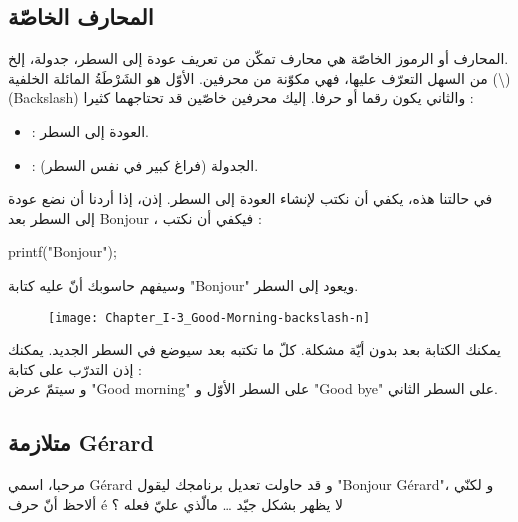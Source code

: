 \subsection{المحارف الخاصّة}

المحارف أو الرموز الخاصّة هي محارف تمكّن من تعريف عودة إلى السطر، جدولة، إلخ.\\
من السهل التعرّف عليها، فهي مكوّنة من محرفين. الأوّل هو الشَرْطَةُ المائلة الخلفية 
(\textbackslash) (\textenglish{Backslash})
والثاني يكون رقما أو حرفا. إليك محرفين خاصّين قد تحتاجهما كثيرا :

\begin{itemize}
  \item {} :
 العودة إلى السطر.
 \item {} :
 الجدولة (فراغ كبير في نفس السطر).
\end{itemize}

في حالتنا هذه، يكفي أن نكتب
 لإنشاء العودة إلى السطر. إذن، إذا أردنا أن نضع عودة إلى السطر بعد
\textenglish{Bonjour}
، فيكفي أن نكتب :

\begin{Csource}
printf("Bonjour\n");
\end{Csource}

وسيفهم حاسوبك أنّ عليه كتابة
"\textenglish{Bonjour}"
 ويعود إلى السطر.

\begin{figure}[H]
	\centering
	\texttt{[image: Chapter\_I-3\_Good-Morning-backslash-n]}
\end{figure}

\begin{information}
  يمكنك الكتابة بعد
بدون أيّة مشكلة. كلّ ما تكتبه بعد
 سيوضع في السطر الجديد. يمكنك إذن التدرّب على كتابة :
\\
و سيتمّ عرض
"\textenglish{Good morning}"
على السطر الأوّل و
"\textenglish{Good bye}"
على السطر الثاني.
\end{information}

\subsection{متلازمة \textenglish{Gérard}}

\begin{question}
  مرحبا، اسمي
\textenglish{Gérard}
و قد حاولت تعديل برنامجك ليقول
"\textenglish{Bonjour Gérard}"،
و لكنّي ألاحظ أنّ حرف
\textenglish{é}
 لا يظهر بشكل جيّد
\dots
 مالّذي عليّ فعله ؟
\end{question}

